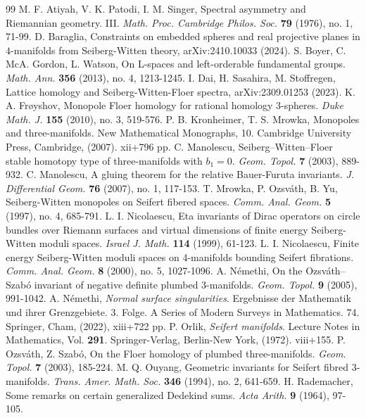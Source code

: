 \documentclass{amsart}
\theoremstyle{definition}
\theoremstyle{remark}
\numberwithin{equation}{section}
\begin{document}


\begin{thebibliography}{99}
M. F. Atiyah, V. K. Patodi, I. M. Singer, Spectral asymmetry and Riemannian geometry. III. {\em Math. Proc. Cambridge Philos. Soc.} {\bf 79} (1976), no. 1, 71-99. 
D. Baraglia, Constraints on embedded spheres and real projective planes in $4$-manifolds from Seiberg-Witten theory, arXiv:2410.10033 (2024).
S. Boyer, C. McA. Gordon, L. Watson, On L-spaces and left-orderable fundamental groups. {\em Math. Ann.} {\bf 356} (2013), no. 4, 1213-1245. 
I. Dai, H. Sasahira, M. Stoffregen, Lattice homology and Seiberg-Witten-Floer spectra, arXiv:2309.01253 (2023).
K. A. Fr\o yshov, Monopole Floer homology for rational homology 3-spheres. {\em Duke Math. J.} {\bf 155} (2010), no. 3, 519-576. 
P. B. Kronheimer, T. S. Mrowka, Monopoles and three-manifolds. New Mathematical Monographs, 10. Cambridge University Press, Cambridge, (2007). xii+796 pp.
C. Manolescu, Seiberg--Witten--Floer stable homotopy type of three-manifolds with $b_1=0$. {\em Geom. Topol.} {\bf 7} (2003), 889-932.
C. Manolescu, A gluing theorem for the relative Bauer-Furuta invariants. {\em J. Differential Geom.} {\bf 76} (2007), no. 1, 117-153. 
T. Mrowka, P. Ozsv\'ath, B. Yu, Seiberg-Witten monopoles on Seifert fibered spaces. {\em Comm. Anal. Geom.} {\bf 5} (1997), no. 4, 685-791.
L. I. Nicolaescu, Eta invariants of Dirac operators on circle bundles over Riemann surfaces and virtual dimensions of finite energy Seiberg-Witten moduli spaces. {\em Israel J. Math.} {\bf 114} (1999), 61-123. 
L. I. Nicolaescu, Finite energy Seiberg-Witten moduli spaces on 4-manifolds bounding Seifert fibrations. {\em Comm. Anal. Geom.} {\bf 8} (2000), no. 5, 1027-1096. 
A. N\'emethi, On the Ozsv\'ath--Szab\'o invariant of negative definite plumbed 3-manifolds. {\em Geom. Topol.} {\bf 9} (2005), 991-1042.
A. N\'emethi, {\em Normal surface singularities}. Ergebnisse der Mathematik und ihrer Grenzgebiete. 3. Folge. A Series of Modern Surveys in Mathematics. 74. Springer, Cham, (2022), xiii+722 pp.
P. Orlik, {\em Seifert manifolds}. Lecture Notes in Mathematics, Vol. {\bf 291}. Springer-Verlag, Berlin-New York, (1972). viii+155.
P. Ozsv\'ath, Z. Szab\'o, On the Floer homology of plumbed three-manifolds. {\em Geom. Topol.} {\bf 7} (2003), 185-224.
M. Q. Ouyang, Geometric invariants for Seifert fibred $3$-manifolds. {\em Trans. Amer. Math. Soc.} {\bf 346} (1994), no. 2, 641-659. 
H. Rademacher, Some remarks on certain generalized Dedekind sums. {\em Acta Arith.} {\bf 9} (1964), 97-105. 
\end{thebibliography}
\end{document}
